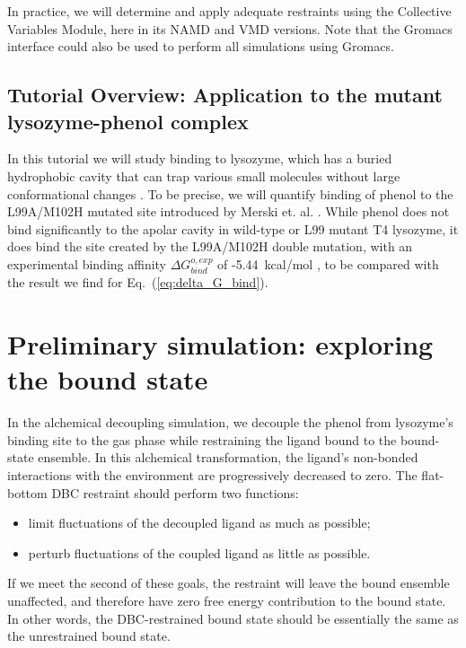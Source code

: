 \documentclass[9pt,tutorial]{livecoms}
\begin{document}
In practice, we will determine and apply adequate restraints using the Collective Variables Module\cite{Fiorin2013}, here in its NAMD and VMD versions.
Note that the Gromacs interface could also be used to perform all simulations using Gromacs.



\subsection{Tutorial Overview: Application to the mutant lysozyme-phenol complex}

In this tutorial we will study binding to lysozyme, which has a buried hydrophobic cavity that can trap various small molecules without large conformational changes \cite{Mannhold2012}. To be precise, we will quantify binding of phenol to the L99A/M102H mutated site introduced by Merski et. al. \cite{Merski2013}.
While phenol does not bind significantly to the apolar cavity in wild-type or L99 mutant T4 lysozyme\cite{Deng2006,Wei2002,Morton1995,Graves2005},
it does bind the site created by the L99A/M102H double mutation, with an experimental binding affinity $ \Delta G_{bind}^{o, exp}$ of -5.44~kcal/mol \cite{Merski2013}, to be compared with the result we find for Eq.~(\ref{eq:delta_G_bind}).






\section{Preliminary simulation: exploring the bound state}

In the alchemical decoupling simulation, we decouple the phenol from lysozyme’s binding site to the gas phase while restraining the ligand bound to the bound-state ensemble.
In this alchemical transformation, the ligand’s non-bonded interactions with the environment are progressively decreased to zero.
The flat-bottom DBC restraint should perform two functions:
\begin{itemize}
    \item limit fluctuations of the decoupled ligand as much as possible;
    \item perturb fluctuations of the coupled ligand as little as possible.
\end{itemize}

If we meet the second of these goals, the restraint will leave the bound ensemble unaffected, and therefore have zero free energy contribution to the bound state.
In other words, the DBC-restrained bound state should be essentially the same as the unrestrained bound state.
\end{document}
